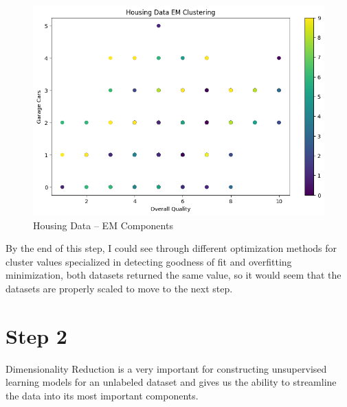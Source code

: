 \documentclass[conference]{IEEEtran}
\begin{document}
\begin{figure}
    \centering
    \includegraphics[width=1.0\linewidth]{figures//housing_figures/step_1d.png}
    \caption{Housing Data -- EM Components}
    \label{fig:4_housing_EM
}
\end{figure}
By the end of this step, I could see through different optimization methods for cluster values specialized in detecting goodness of fit and overfitting minimization, both datasets returned the same value, so it would seem that the datasets are properly scaled to move to the next step.
\section{Step 2}
Dimensionality Reduction is a very important for constructing unsupervised learning models for an unlabeled dataset and gives us the ability to streamline the data into its most important components. 
\end{document}
